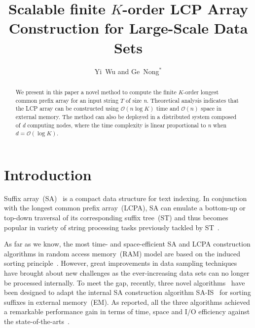\documentclass{llncs}
\begin{document}
\title{Scalable finite $K$-order {LCP} Array Construction for Large-Scale Data Sets}

\author{Yi~Wu and Ge~Nong$^*$}

\maketitle

\begin{abstract}
We present in this paper a novel method to compute the finite $K$-order longest common prefix array for an input string $T$ of size {\em n}. Theoretical analysis indicates that the {LCP} array can be constructed using $\mathcal{O}(n\log K)$ time and $\mathcal{O}(n)$ space in external memory. The method can also be deployed in a distributed system composed of {\em d} computing nodes, where the time complexity is linear proportional to {\em n} when $d=\mathcal{O}(\log K)$.
\end{abstract}

\section{Introduction}

Suffix array~({SA})~\cite{Manber1993} is a compact data structure for text indexing. In conjunction with the longest common prefix array~({LCPA}), {SA} can emulate a bottom-up or top-down traversal of its corresponding suffix tree~({ST}) and thus becomes popular in variety of string processing tasks previously tackled by {ST}~\cite{Abouelhodaa2004}.

As far as we know, the most time- and space-efficient SA and {LCPA} construction algorithms in random access memory~(RAM) model are based on the induced sorting principle~\cite{nong2011,Fischer11}. However, great improvements in data sampling techniques have brought about new challenges as the ever-increasing data sets can no longer be processed internally. To meet the gap, recently, three novel algorithms~\cite{Nong15, Bingmann-Code12, Nong14} have been designed to adapt the internal {SA} construction algorithm {SA-IS}~\cite{nong2011} for sorting suffixes in external memory~(EM). As reported, all the three algorithms achieved a remarkable performance gain in terms of time, space and I/O efficiency against the state-of-the-arts~\cite{Dementiev08}.
\end{document}
